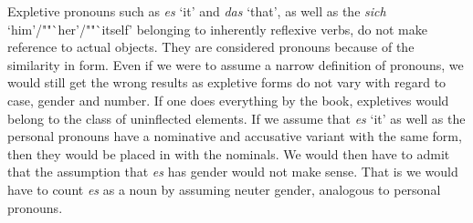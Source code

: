 Expletive pronouns such as \emph{es} `it' and \emph{das} `that', as well as
the \emph{sich} `him'/""`her'/""`itself' belonging to inherently reflexive verbs, do not make
reference to actual objects. They are considered pronouns because of the similarity in form. Even if
we were to assume a narrow definition of pronouns, we would still get the wrong results as expletive
forms do not vary with regard to case, gender and number. If one does everything by the book,
expletives would belong to the class of uninflected elements. If we assume that \emph{es} `it' as
well as the personal pronouns have a nominative and accusative variant with the same form, then they
would be placed in with the nominals. We would then have to admit that the assumption that \emph{es}
has gender would not make sense. That is we would have to count \emph{es} as a noun by assuming
neuter gender, analogous to personal pronouns.%

